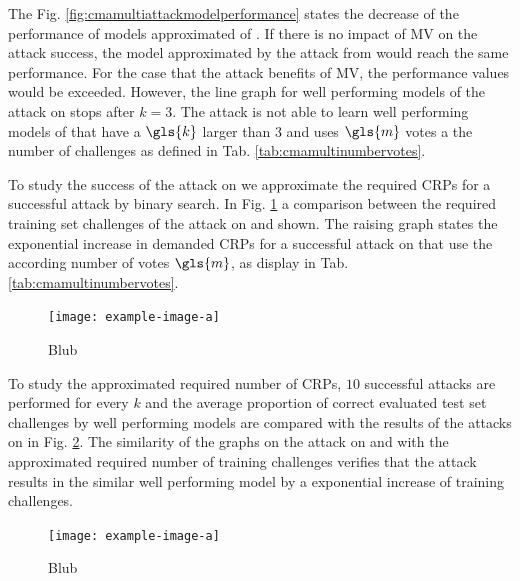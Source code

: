 The Fig. \ref{fig:cmamultiattackmodelperformance} states the decrease of the performance of models approximated of \xpufs.
If there is no impact of \ac{MV} on the attack success, the model approximated by the attack from \mxpufs would reach the same performance.
For the case that the attack benefits of \ac{MV}, the performance values would be exceeded.
However, the line graph for well performing models of the attack on \mxpufs stops after $k = 3$.
The attack is not able to learn well performing models of \mxpufs that have a $\gls{k}$ larger than $3$ and uses $\gls{m}$ votes a the number of challenges as defined in Tab. \ref{tab:cmamultinumbervotes}.

To study the success of the attack on \mxpufs we approximate the required \acp{CRP} for a successful attack by binary search.
In Fig. \ref{fig:cmamultiattackrequiredcrp} a comparison between the required training set challenges of the attack on \xpufs and \mxpufs shown.
The raising graph states the exponential increase in demanded \acp{CRP} for a successful attack on \mxpufs that use the according number of votes $\gls{m}$, as display in Tab. \ref{tab:cmamultinumbervotes}.

\begin{figure}[ht]
\noindent\texttt{[image: example-image-a]}
\caption[blub]{Blub}
\label{fig:cmamultiattackrequiredcrp}
\end{figure}

To study the approximated required number of \acp{CRP}, $10$ successful attacks are performed for every $k$ and the average proportion of correct evaluated test set challenges by well performing models are compared with the results of the attacks on \xpufs in Fig. \ref{fig:cmamultiattackmvmodelperformance}.
The similarity of the graphs on the attack on \xpufs and \mxpufs with the approximated required number of training challenges verifies that the attack results in the similar well performing model by a exponential increase of training challenges.

\begin{figure}[ht]
\noindent\texttt{[image: example-image-a]}
\caption[blub]{Blub}
\label{fig:cmamultiattackmvmodelperformance}
\end{figure}

